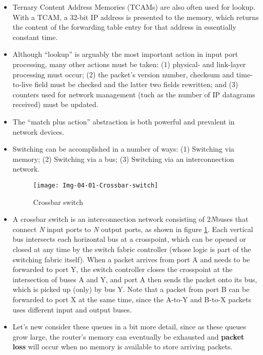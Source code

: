 \begin{itemize}
\item
Ternary Content Address Memories (TCAMs) are also often used for lookup. With a TCAM, a 32-bit IP address is presented to the memory, which returns the content of the forwarding table entry for that address in essentially constant time.

\item
Although ``lookup'' is arguably the most important action in input port processing, many other actions must be taken: (1) physical- and link-layer processing must occur; (2) the packet's version number, checksum and time-to-live field must be checked and the latter two fields rewritten; and (3) counters used for network management (tuch as the number of IP datagrams received) must be updated.

\item
The ``match plus action'' abstraction is both powerful and prevalent in network devices.

\item
Switching can be accomplished in a number of ways: (1) Switching via memory; (2) Switching via a bus; (3) Switching via an interconnection network.

\begin{figure}[h]
\texttt{[image: Img-04-01-Crossbar-switch]}
\centering
\caption{Crossbar switch}
\label{fig:fig-04-01}
\end{figure}

\item
A crossbar switch is an interconnection network consisting of 2\textit{N}buses that connect \textit{N} input ports to \textit{N} output ports, as shown in figure \ref{fig:fig-04-01}. Each vertical bus intersects each horizontal bus at a crosspoint, which can be opened or closed at any time by the switch fabric controller (whose logic is part of the switching fabric itself). When a packet arrives from port A and needs to be forwarded to port Y, the switch controller closes the crosspoint at the intersection of buses A and Y, and port A then sends the packet onto its bus, which is picked up (only) by bus Y. Note that a packet from port B can be forwarded to port X at the same time, since the A-to-Y and B-to-X packets uses different input and output buses.

\item
Let's new consider these queues in a bit more detail, since as these queues grow large, the router's memory can eventually be exhausted and \textbf{packet loss} will occur when no memory is available to store arriving packets.


\end{itemize}
